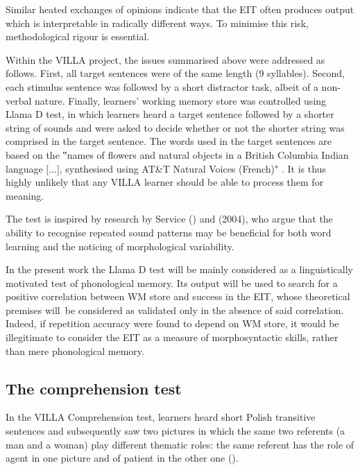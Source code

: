 Similar heated exchanges of opinions indicate that the EIT often produces output which is interpretable in radically different ways. To minimise this risk, methodological rigour is essential.

Within the VILLA project, the issues summarised above were addressed as follows. First, all target sentences were of the same length (9 syllables). Second, each stimulus sentence was followed by a short distractor task, albeit of a non-verbal nature. Finally, learners' working memory store was controlled using  Llama D test, in which learners heard a target sentence followed by a shorter string of sounds and were asked to decide whether or not the shorter string was comprised in the target sentence. The words used in the target sentences are based on the ‟names of flowers and natural objects in a British Columbia Indian language [...], synthesised using AT\&T Natural Voices (French)" \citep[8]{Meara2005}. It is thus highly unlikely that any VILLA learner should be able to process them for meaning.

The test is inspired by research by Service (\citet{Service1992, ServiceKohonen1995}) and \citeauthor{SpecialeEtAl2004} (2004), who argue that the ability to recognise repeated sound patterns may be beneficial for both word learning and the noticing of morphological variability. 

In the present work the Llama D test will be mainly considered as a linguistically motivated test of phonological memory. Its output will be used to search for a positive correlation between WM store and success in the EIT, whose theoretical premises will~be considered as validated only in the absence of said correlation. Indeed, if repetition accuracy were found to depend on WM store, it would be illegitimate to consider the EIT as a measure of morphosyntactic skills, rather than mere phonological memory.

\subsection{The comprehension test}\label{sec:02:4.4}

In the VILLA Comprehension test, learners heard short Polish transitive sentences and subsequently saw two pictures in which the same two referents (a man and a woman) play different thematic roles: the same referent has the role of agent in one picture and of patient in the other one ().

